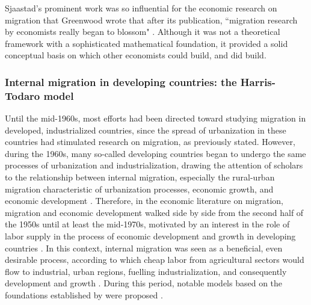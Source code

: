 Sjaastad's prominent work was so influential for the economic research on migration that Greenwood wrote that after its publication, ``migration research by economists really began to blossom" \citep[p. 669]{greenwood_internal_1997}. Although it was not a theoretical framework with a sophisticated mathematical foundation, it provided a solid conceptual basis on which other economists could build, and did build.

\subsubsection{Internal migration in developing countries: the Harris-Todaro model}

Until the mid-1960s, most efforts had been directed toward studying migration in developed, industrialized countries, since the spread of urbanization in these countries had stimulated research on migration, as previously stated. However, during the 1960s, many so-called developing countries began to undergo the same processes of urbanization and industrialization, drawing the attention of scholars to the relationship between internal migration, especially the rural-urban migration characteristic of urbanization processes, economic growth, and economic development \citep{lewis_economic_1954, ranis_theory_1961, easterlin_internal_1980}. Therefore, in the economic literature on migration, migration and economic development walked side by side from the second half of the 1950s until at least the mid-1970s, motivated by an interest in the role of labor supply in the process of economic development and growth in developing countries \citep{lewis_economic_1954, ranis_theory_1961}. In this context, internal migration was seen as a beneficial, even desirable process, according to which cheap labor from agricultural sectors would flow to industrial, urban regions, fuelling industrialization, and consequently development and growth \citep{easterlin_internal_1980}. During this period, notable models based on the foundations established by \cite{sjaastad_costs_1962} were proposed \citep{lucas_internal_1997}.

